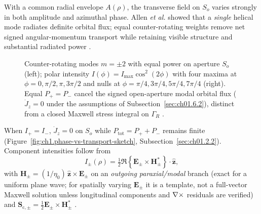 With a common radial envelope \(A(\rho)\), the transverse field on \(S_o\) varies strongly in both amplitude and azimuthal phase. Allen \emph{et al.} \cite{allen1992} showed that a \emph{single} helical mode radiates definite orbital flux; equal counter-rotating weights remove net signed angular-momentum transport while retaining visible structure and substantial radiated power \cite{poynting1884}.

\begin{figure}[t]
\centering
\VolIPhysFig{\VolIPhysCounterRotatingAperture}
\caption{Counter-rotating modes $m=\pm2$ with equal power on aperture $S_o$ (left); polar intensity $I(\phi)=I_{\max}\cos^2(2\phi)$ with four maxima at $\phi=0,\pi/2,\pi,3\pi/2$ and nulls at $\phi=\pi/4,3\pi/4,5\pi/4,7\pi/4$ (right). Equal $P_+=P_-$ cancel the signed open-aperture modal orbital flux ($\dot J_z=0$ under the assumptions of Subsection~\ref{sec:ch01.6.2}), distinct from a closed Maxwell stress integral on $\Gamma_R$ \cite{allen1992,poynting1884}.}
\label{fig:ch1.ex62-counter-rotating-aperture}
\end{figure}

When \(I_+=I_-\), $\dot J_z=0$ on $S_o$ while $P_{\mathrm{tot}}=P_++P_-$ remains finite (Figure~\ref{fig:ch1.phase-vs-transport-sketch}, Subsection~\ref{sec:ch01.2.2}). Component intensities follow from
\begin{equation}
\label{eq:ch1.ex62-intensity-definition}
I_\pm(\rho)=\tfrac12\Re\!\left\{\mathbf{E}_\pm\times\mathbf{H}_\pm^*\right\}\cdot\hat{\mathbf{z}},
\end{equation}
with $\mathbf{H}_\pm=(1/\eta_0)\,\hat{\mathbf{z}}\times\mathbf{E}_\pm$ on an \emph{outgoing paraxial/modal} branch (exact for a uniform plane wave; for spatially varying $\mathbf{E}_\pm$ it is a template, not a full-vector Maxwell solution unless longitudinal components and $\nabla\times$ residuals are verified) and $\mathbf{S}_{\mathrm{c},\pm}=\tfrac12\mathbf{E}_\pm\times\mathbf{H}_\pm^*$ \cite{stratton1941,allen1992}.

